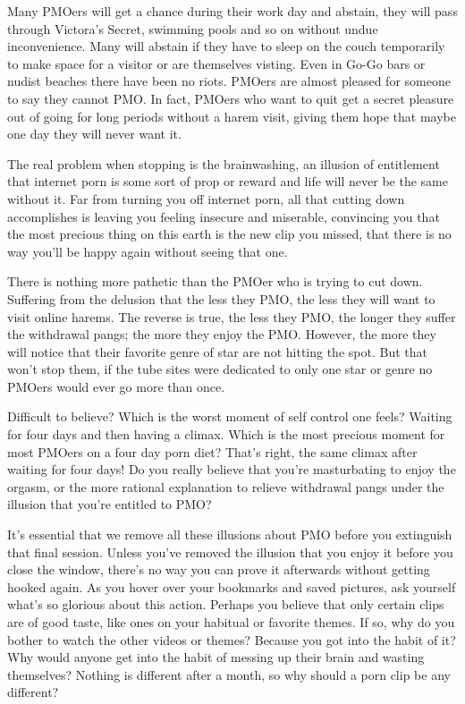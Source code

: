 \documentclass[easypeasy.tex]{subfiles}
\begin{document}
Many PMOers will get a chance during their work day and abstain, they will pass through Victora's Secret, swimming pools and so on without undue inconvenience. Many will abstain if they have to sleep on the couch temporarily to make space for a visitor or are themselves visting. Even in Go-Go bars or nudist beaches there have been no riots. PMOers are almost pleased for someone to say they cannot PMO. In fact, PMOers who want to quit get a secret pleasure out of going for long periods without a harem visit, giving them hope that maybe one day they will never want it.

The real problem when stopping is the brainwashing, an illusion of entitlement that internet porn is some sort of prop or reward and life will never be the same without it. Far from turning you off internet porn, all that cutting down accomplishes is leaving you feeling insecure and miserable, convincing you that the most precious thing on this earth is the new clip you missed, that there is no way you'll be happy again without seeing that one.

There is nothing more pathetic than the PMOer who is trying to cut down. Suffering from the delusion that the less they PMO, the less they will want to visit online harems. The reverse is true, the less they PMO, the longer they suffer the withdrawal pangs; the more they enjoy the PMO. However, the more they will notice that their favorite genre of star are not hitting the spot. But that won't stop them, if the tube sites were dedicated to only one star or genre no PMOers would ever go more than once.

Difficult to believe? Which is the worst moment of self control one feels? Waiting for four days and then having a climax. Which is the most precious moment for most PMOers on a four day porn diet? That's right, the same climax after waiting for four days! Do you really believe that you're masturbating to enjoy the orgasm, or the more rational explanation to relieve withdrawal pangs under the illusion that you're entitled to PMO?

It's essential that we remove all these illusions about PMO before you extinguish that final session. Unless you've removed the illusion that you enjoy it before you close the window, there's no way you can prove it afterwards without getting hooked again. As you hover over your bookmarks and saved pictures, ask yourself what's so glorious about this action. Perhaps you believe that only certain clips are of good taste, like ones on your habitual or favorite themes. If so, why do you bother to watch the other videos or themes? Because you got into the habit of it? Why would anyone get into the habit of messing up their brain and wasting themselves? Nothing is different after a month, so why should a porn clip be any different?
\end{document}
